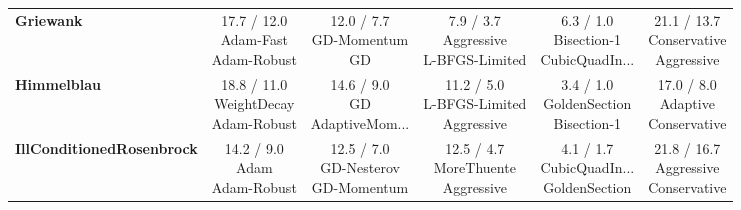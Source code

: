\documentclass[10pt]{article}
\begin{document}
\begin{longtable}{lccccc}
\textbf{Griewank} &  \makecell{17.7 / 12.0 \\ \scriptsize{Adam-Fast} \\ \scriptsize{Adam-Robust}}&  \makecell{12.0 / 7.7 \\ \scriptsize{GD-Momentum} \\ \scriptsize{GD}}&  \makecell{7.9 / 3.7 \\ \scriptsize{Aggressive} \\ \scriptsize{L-BFGS-Limited}}& \cellcolor{green!20} \makecell{6.3 / 1.0 \\ \scriptsize{Bisection-1} \\ \scriptsize{CubicQuadIn...}}& \cellcolor{red!15} \makecell{21.1 / 13.7 \\ \scriptsize{Conservative} \\ \scriptsize{Aggressive}} \\
\textbf{Himmelblau} & \cellcolor{red!15} \makecell{18.8 / 11.0 \\ \scriptsize{WeightDecay} \\ \scriptsize{Adam-Robust}}&  \makecell{14.6 / 9.0 \\ \scriptsize{GD} \\ \scriptsize{AdaptiveMom...}}&  \makecell{11.2 / 5.0 \\ \scriptsize{L-BFGS-Limited} \\ \scriptsize{Aggressive}}& \cellcolor{green!20} \makecell{3.4 / 1.0 \\ \scriptsize{GoldenSection} \\ \scriptsize{Bisection-1}}&  \makecell{17.0 / 8.0 \\ \scriptsize{Adaptive} \\ \scriptsize{Conservative}} \\
\textbf{IllConditionedRosenbrock} &  \makecell{14.2 / 9.0 \\ \scriptsize{Adam} \\ \scriptsize{Adam-Robust}}&  \makecell{12.5 / 7.0 \\ \scriptsize{GD-Nesterov} \\ \scriptsize{GD-Momentum}}&  \makecell{12.5 / 4.7 \\ \scriptsize{MoreThuente} \\ \scriptsize{Aggressive}}& \cellcolor{green!20} \makecell{4.1 / 1.7 \\ \scriptsize{CubicQuadIn...} \\ \scriptsize{GoldenSection}}& \cellcolor{red!15} \makecell{21.8 / 16.7 \\ \scriptsize{Aggressive} \\ \scriptsize{Conservative}} \\

\end{longtable}
\end{document}
